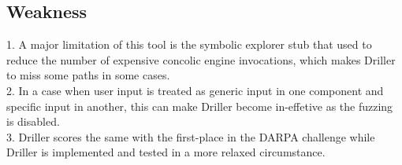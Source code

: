 \documentclass[letterpaper,11pt]{article}
\begin{document}
\subsection {Weakness}
1. A major limitation of this tool is the symbolic explorer stub that used to reduce the number of expensive concolic engine invocations, which makes Driller to miss some paths in some cases.\\ 
2. In a case when user input is treated as generic input in one component and specific input in another, this can make Driller become in-effetive as the fuzzing is disabled.\\ 
3. Driller scores the same with the first-place in the DARPA challenge while Driller is implemented and tested in a more relaxed circumstance.


  
\end{document}
